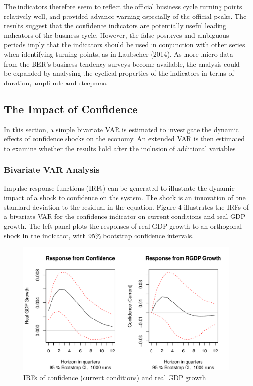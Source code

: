 \documentclass[11pt,]{article}
\begin{document}
The indicators therefore seem to reflect the official business cycle
turning points relatively well, and provided advance warning especially
of the official peaks. The results suggest that the confidence
indicators are potentially useful leading indicators of the business
cycle. However, the false positives and ambiguous periods imply that the
indicators should be used in conjunction with other series when
identifying turning points, as in Laubscher (2014). As more micro-data
from the BER's business tendency surveys become available, the analysis
could be expanded by analysing the cyclical properties of the indicators
in terms of duration, amplitude and steepness.

\subsection{The Impact of Confidence}\label{the-impact-of-confidence-2}

In this section, a simple bivariate VAR is estimated to investigate the
dynamic effects of confidence shocks on the economy. An extended VAR is
then estimated to examine whether the results hold after the inclusion
of additional variables.

\subsubsection{Bivariate VAR Analysis}\label{bivariate-var-analysis}

Impulse response functions (IRFs) can be generated to illustrate the
dynamic impact of a shock to confidence on the system. The shock is an
innovation of one standard deviation to the residual in the equation.
Figure 4 illustrates the IRFs of a bivariate VAR for the confidence
indicator on current conditions and real GDP growth. The left panel
plots the responses of real GDP growth to an orthogonal shock in the
indicator, with 95\% bootstrap confidence intervals.

\begin{figure}
\centering
\includegraphics{BCon_5_Journal_files/figure-latex/figure4-1.pdf}
\caption{IRFs of confidence (current conditions) and real GDP growth}
\end{figure}
\end{document}
